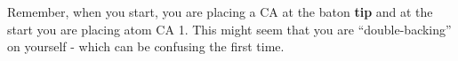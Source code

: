 \documentclass{article}
\begin{document}
  Remember, when you start, you are placing a CA at the baton
  \textbf{tip} and at the start you are placing atom CA 1.  This might
  seem that you are ``double-backing'' on yourself - which can be
  confusing the first time.







\end{document}
